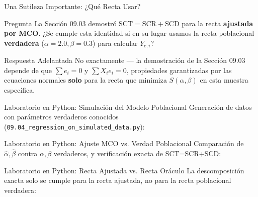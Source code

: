 \documentclass[10pt, aspectratio=169]{beamer}
\begin{document}
\begin{frame}{Una Sutileza Importante: ¿Qué Recta Usar?}
  \footnotesize
  \begin{alertblock}{Pregunta}
    La Sección 09.03 demostró $\text{SCT}=\text{SCR}+\text{SCD}$ para la recta \textbf{ajustada por MCO}. ¿Se cumple esta identidad si en su lugar usamos la recta poblacional \textbf{verdadera} ($\alpha=2.0,\beta=0.3$) para calcular $Y_{e,i}$?
  \end{alertblock}
  \pause

  \vspace{0.1cm}
  \begin{block}{Respuesta Adelantada}
    No exactamente --- la demostración de la Sección 09.03 depende de que $\sum e_i=0$ y $\sum X_ie_i=0$, propiedades garantizadas por las ecuaciones normales \textbf{solo} para la recta que minimiza $S(\alpha,\beta)$ en esta muestra específica.
  \end{block}
\end{frame}

\begin{frame}[fragile]{Laboratorio en Python: Simulación del Modelo Poblacional}
  \scriptsize
  Generación de datos con parámetros verdaderos conocidos (\texttt{09.04\_regression\_on\_simulated\_data.py}):
  {
  }
\end{frame}

\begin{frame}[fragile]{Laboratorio en Python: Ajuste MCO vs. Verdad Poblacional}
  \scriptsize
  Comparación de $\hat\alpha,\hat\beta$ contra $\alpha,\beta$ verdaderos, y verificación exacta de SCT=SCR+SCD:
  {
  }
\end{frame}

\begin{frame}[fragile]{Laboratorio en Python: Recta Ajustada vs. Recta Oráculo}
  \scriptsize
  La descomposición exacta solo se cumple para la recta ajustada, no para la recta poblacional verdadera:
  {
  }
\end{frame}
\end{document}

